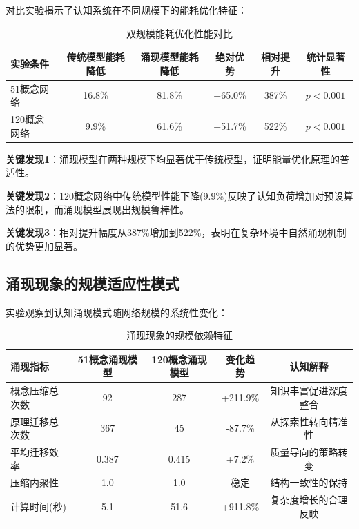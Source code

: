 \documentclass[12pt,a4paper]{article}
\begin{document}
对比实验揭示了认知系统在不同规模下的能耗优化特征：

\begin{table}[h]
\centering
\caption{双规模能耗优化性能对比}
\label{tab:dual_scale_energy}
\begin{tabular}{lccccc}
\toprule
\textbf{实验条件} & \textbf{传统模型能耗降低} & \textbf{涌现模型能耗降低} & \textbf{绝对优势} & \textbf{相对提升} & \textbf{统计显著性} \\
\midrule
51概念网络 & 16.8\% & 81.8\% & +65.0\% & 387\% & $p < 0.001$ \\
120概念网络 & 9.9\% & 61.6\% & +51.7\% & 522\% & $p < 0.001$ \\
\bottomrule
\end{tabular}
\end{table}

\textbf{关键发现1}：涌现模型在两种规模下均显著优于传统模型，证明能量优化原理的普适性。

\textbf{关键发现2}：120概念网络中传统模型性能下降(9.9\%)反映了认知负荷增加对预设算法的限制，而涌现模型展现出规模鲁棒性。

\textbf{关键发现3}：相对提升幅度从387\%增加到522\%，表明在复杂环境中自然涌现机制的优势更加显著。

\subsection{涌现现象的规模适应性模式}

实验观察到认知涌现模式随网络规模的系统性变化：

\begin{table}[h]
\centering
\caption{涌现现象的规模依赖特征}
\label{tab:scale_dependent_emergence}
\begin{tabular}{p{3.5cm}cccc}
\toprule
\textbf{涌现指标} & \textbf{51概念涌现模型} & \textbf{120概念涌现模型} & \textbf{变化趋势} & \textbf{认知解释} \\
\midrule
概念压缩总次数 & 92 & 287 & +211.9\% & 知识丰富促进深度整合 \\
原理迁移总次数 & 367 & 45 & -87.7\% & 从探索性转向精准性 \\
平均迁移效率 & 0.387 & 0.415 & +7.2\% & 质量导向的策略转变 \\
压缩内聚性 & 1.0 & 1.0 & 稳定 & 结构一致性的保持 \\
计算时间(秒) & 5.1 & 51.6 & +911.8\% & 复杂度增长的合理反映 \\
\bottomrule
\end{tabular}
\end{table}
\end{document}
